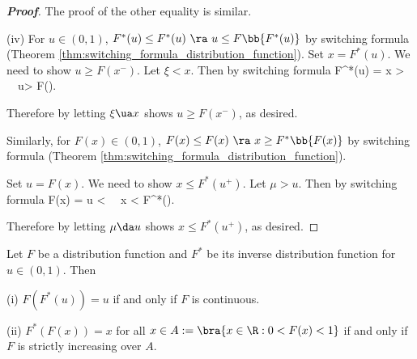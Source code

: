 \begin{proof}[\bf Proof]
The proof of the other equality is similar.
%
%

\item [(iv)] For $u\in (0,1)$, $F^*(u) \leq F^*(u) \ \ra \ u\leq F\bb{F^*(u)}$ by switching formula (Theorem \ref{thm:switching_formula_distribution_function}). Set $x = F^*(u)$. We need to show $u\geq F(x^-)$. Let $\xi < x$. Then by switching formula
\be
F^*(u) = x > \xi \ \ra \ u> F(\xi).
\ee

Therefore by letting $\xi \ua x$ shows $u\geq F(x^-)$, as desired. 

Similarly, for $F(x)\in (0,1)$, $F(x) \leq F(x) \ \ra \ x \geq F^*\bb{F(x)}$ by switching formula (Theorem \ref{thm:switching_formula_distribution_function}).

Set $u = F(x)$. We need to show $x \leq F^*(u^+)$. Let $\mu > u$. Then by switching formula
\be
F(x) = u < \mu \ \ra \ x < F^*(\mu).
\ee

Therefore by letting $\mu \da u$ shows $x \leq F^*(u^+)$, as desired. 
\een
\end{proof}

\begin{corollary}\label{cor:continuous_distribution_function_inverse_composition}
Let $F$ be a distribution function and $F^*$ be its inverse distribution function for $u\in (0,1)$. Then
\ben
\item [(i)] $F(F^*(u)) = u$ if and only if $F$ is continuous.
\item [(ii)] $F^*(F(x)) = x$ for all $x\in A:=\bra{x\in \R:0<F(x)<1}$ if and only if $F$ is strictly increasing over $A$.
\een
\end{corollary}

